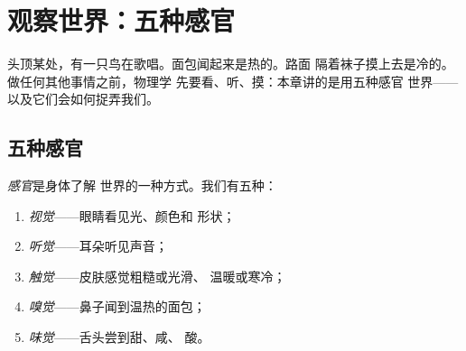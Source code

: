 \chapter{观察世界：五种感官}\label{ch:g1:five-senses}

头顶某处，有一只鸟在歌唱。面包闻起来是热的。路面
隔着袜子摸上去是冷的。做任何其他事情之前，物理学
先要看、听、摸：本章讲的是用五种感官
世界——以及它们会如何捉弄我们。

\section{五种感官}

\begin{definition}[五种感官]\label{def:g1:five-senses:senses}
\emph{感官}是身体了解
世界的一种方式。我们有五种：
\begin{enumerate}
  \item \emph{视觉}——眼睛看见光、颜色和
        形状；
  \item \emph{听觉}——耳朵听见声音；
  \item \emph{触觉}——皮肤感觉粗糙或光滑、
        温暖或寒冷；
  \item \emph{嗅觉}——鼻子闻到温热的面包；
  \item \emph{味觉}——舌头尝到甜、咸、
        酸。
\end{enumerate}
\end{definition}

